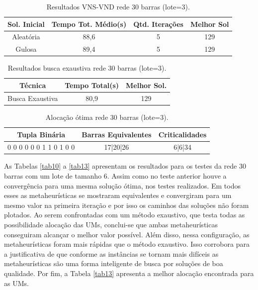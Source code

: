 \documentclass[12pt]{article}
\begin{document}
\begin{table}[H]
	\centering
	\caption{Resultados VNS-VND rede 30 barras (lote=3).}
	\begin{tabular}{|c|c|c|c|}
		\hline
		\textbf{Sol. Inicial} & \textbf{Tempo Tot. Médio(s)} & \textbf{Qtd. Iterações} & \textbf{Melhor Sol} \\
		\hline
		Aleatória & 88,6  & 5     & 129 \\
		\hline
		Gulosa & 89,4  & 5     & 129 \\
		\hline
	\end{tabular}%
	\label{tab7}%
\end{table}%


\begin{table}[H]
	\centering
	\caption{Resultados busca exaustiva rede 30 barras (lote=3).}
	\begin{tabular}{|c|c|c|}
		\hline
		\textbf{Técnica} & \textbf{Tempo Total(s)} & \textbf{Melhor Sol.} \\
		\hline
		Busca Exaustiva & 80,9  & 129 \\
		\hline
	\end{tabular}%
	\label{tab8}%
\end{table}%

\begin{table}[H]
	\centering
	\caption{Alocação ótima rede 30 barras (lote=3).}
	\begin{tabular}{|l|c|c|}
		\hline
		\multicolumn{1}{|c|}{\textbf{Tupla Binária}} & \textbf{Barras Equivalentes} & \multicolumn{1}{l|}{\textbf{Criticalidades}} \\
		\hline
		0 0 0 0 0 0 1 1 0 1 0 0 & 17|20|26 & 6|6|34 \\
		\hline
	\end{tabular}%
	\label{tab9}%
\end{table}%

As Tabelas \ref{tab10} a \ref{tab13} apresentam os resultados para os testes da rede 30 barras com um lote de tamanho 6. Assim como no teste anterior houve a convergência para uma mesma solução ótima, nos testes realizados. Em todos esses as metaheurísticas se mostraram equivalentes e convergiram para um mesmo valor na primeira iteração e por isso os caminhos das soluções não foram plotados. Ao serem confrontadas com um método exaustivo, que testa todas as possibilidade alocação das UMs, conclui-se que ambas metaheurísticas conseguiram alcançar o melhor valor possível. Além disso, nessa configuração, as metaheurísticas foram mais rápidas que o método exaustivo. Isso corrobora para a justificativa de que conforme as instâncias se tornam mais difíceis as metaheurísticas são uma forma inteligente de busca por soluções de boa qualidade. Por fim, a Tabela \ref{tab13} apresenta a melhor alocação encontrada para as UMs.
\end{document}
